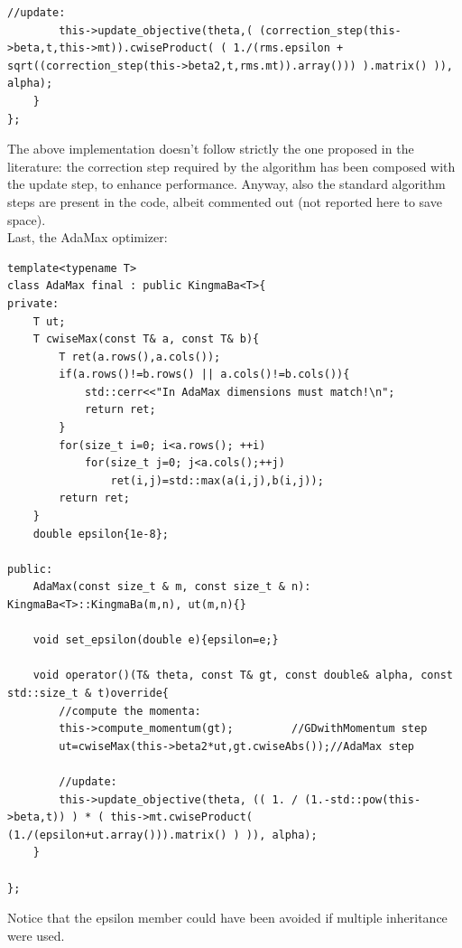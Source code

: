 \documentclass[12pt, a4paper]{report}
\theoremstyle{definition}
\begin{document}
{\begin{lstlisting}[frame=single, showstringspaces=false]
		//update:
		this->update_objective(theta,( (correction_step(this->beta,t,this->mt)).cwiseProduct( ( 1./(rms.epsilon + sqrt((correction_step(this->beta2,t,rms.mt)).array())) ).matrix() )), alpha);
	}	
};
\end{lstlisting}
The above implementation doesn't follow strictly the one proposed in the literature: the correction step required by the algorithm has been composed with the update step, to enhance performance. Anyway, also the standard algorithm steps are present in the code, albeit commented out (not reported here to save space).\\
Last, the AdaMax optimizer:
\begin{lstlisting}[frame=single, showstringspaces=false]
template<typename T>
class AdaMax final : public KingmaBa<T>{
private:
	T ut;
	T cwiseMax(const T& a, const T& b){
		T ret(a.rows(),a.cols());
		if(a.rows()!=b.rows() || a.cols()!=b.cols()){
			std::cerr<<"In AdaMax dimensions must match!\n";
			return ret;
		}
		for(size_t i=0; i<a.rows(); ++i)
			for(size_t j=0; j<a.cols();++j)
				ret(i,j)=std::max(a(i,j),b(i,j));
		return ret;
	}
	double epsilon{1e-8};
	
public:
	AdaMax(const size_t & m, const size_t & n): KingmaBa<T>::KingmaBa(m,n), ut(m,n){}

	void set_epsilon(double e){epsilon=e;}
	
	void operator()(T& theta, const T& gt, const double& alpha, const std::size_t & t)override{
		//compute the momenta:
		this->compute_momentum(gt);		  	//GDwithMomentum step
		ut=cwiseMax(this->beta2*ut,gt.cwiseAbs());//AdaMax step
	
		//update:
		this->update_objective(theta, (( 1. / (1.-std::pow(this->beta,t)) ) * ( this->mt.cwiseProduct( (1./(epsilon+ut.array())).matrix() ) )), alpha);
	}

};
\end{lstlisting}
Notice that the epsilon member could have been avoided if multiple inheritance were used.
}
\end{document}

